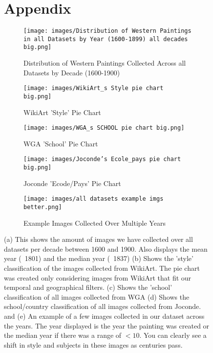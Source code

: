 \documentclass[10pt,twocolumn,letterpaper]{article}
\begin{document}
\begin{figure*}[t]
\section*{Appendix}
    \centering
    \begin{subfigure}[t]{\textwidth}
        \centering
        \texttt{[image: images/Distribution of Western Paintings in all Datasets by Year (1600-1899) all decades big.png]}
        \caption{Distribution of Western Paintings Collected Across all Datasets by Decade (1600-1900)}
        \label{fig:subfig-a}
    \end{subfigure}
    
    \begin{subfigure}[t]{0.3\textwidth}
        \texttt{[image: images/WikiArt\_s Style pie chart big.png]}
        \caption{WikiArt 'Style' Pie Chart}
        \label{fig:subfig-b}
    \end{subfigure}
    \hfill
    \begin{subfigure}[t]{0.3\textwidth}
        \texttt{[image: images/WGA\_s SCHOOL pie chart big.png]}
        \caption{WGA 'School' Pie Chart}
        \label{fig:subfig-c}
    \end{subfigure}
    \hfill
    \begin{subfigure}[t]{0.3\textwidth}
        \texttt{[image: images/Joconde's Ecole\_pays pie chart big.png]}
        \caption{Joconde 'Ecode/Pays' Pie Chart}
        \label{fig:subfig-d}
    \end{subfigure}

    \begin{subfigure}[t]{\textwidth}
        \centering
        \texttt{[image: images/all datasets example imgs better.png]}
        \caption{Example Images Collected Over Multiple Years}
        \label{fig:subfig-e}
    \end{subfigure}

    \caption{(a) This shows the amount of images we have collected over all datasets per decade between 1600 and 1900. Also displays the mean year (~1801) and the median year (~1837) (b) Shows the 'style' classification of the images collected from WikiArt. The pie chart was created only considering images from WikiArt that fit our temporal and geographical filters. (c) Shows the 'school' classification of all images collected from WGA (d) Shows the school/country classification of all images collected from Joconde. and (e) An example of a few images collected in our dataset across the years. The year displayed is the year the painting was created or the median year if there was a range of $<10$. You can clearly see a shift in style and subjects in these images as centuries pass.}
    \label{fig:combined-figure}
\end{figure*}
\end{document}
